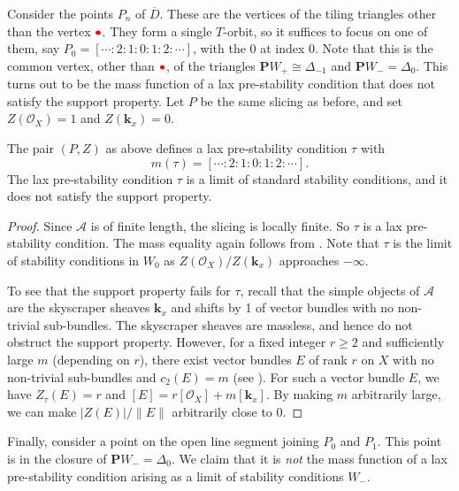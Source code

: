 \documentclass{amsart}
\begin{document}
Consider the points \(P_n\) of \(\overline D\).
These are the vertices of the tiling triangles other than the vertex \(\textcolor{red}{\bullet}\).
They form a single \(T\)-orbit, so it suffices to focus on one of them, say \(P_0 = [\cdots : 2:1:0:1:2: \cdots]\), with the \(0\) at index \(0\).
Note that this is the common vertex, other than \(\textcolor{red}{\bullet}\), of the triangles \(\mathbf{P}W_{+} \cong \Delta_{-1}\) and \(\mathbf{P}W_- = \Delta_0\).
This turns out to be the mass function of a lax pre-stability condition that does not satisfy the support property.
Let \(P\) be the same slicing as before, and set \(Z(\mathcal{O}_X) = 1\) and \(Z(\mathbf{k}_x) = 0\).
\begin{proposition}\label{prop:v0}
  The pair \((P,Z)\) as above defines a lax pre-stability condition \(\tau\) with
\[m(\tau) = [\cdots : 2: 1 : 0: 1 : 2: \cdots].\]
  The lax pre-stability condition \(\tau\) is a limit of standard stability conditions, and it does not satisfy the support property.
\end{proposition}
\begin{proof}
  Since \(\mathcal{A}\) is of finite length, the slicing is locally finite.
  So \(\tau\) is a lax pre-stability condition.
  The mass equality again follows from .
  Note that \(\tau\) is the limit of stability conditions in \(W_0\) as \(Z(\mathcal{O}_X)/Z(\mathbf{k}_x)\) approaches \(-\infty\).

  To see that the support property fails for \(\tau\), recall that the simple objects of \(\mathcal{A}\) are the skyscraper sheaves \(\mathbf{k}_x\) and shifts by 1 of vector bundles with no non-trivial sub-bundles.
  The skyscraper sheaves are massless, and hence do not obstruct the support property.
  However, for a fixed integer \(r \geq 2\) and sufficiently large \(m\) (depending on \(r\)), there exist vector bundles \(E\) of rank \(r\) on \(X\) with no non-trivial sub-bundles and \(c_2(E) = m\) (see \cite[Th\'eor\`eme~5.3]{ban.le-pot:87}).
  For such a vector bundle \(E\), we have \(Z_{\tau}(E) = r\) and \([E] = r [\mathcal{O}_X] + m [\mathbf{k}_x]\).
  By making \(m\) arbitrarily large, we can make \(|Z(E)|/\|E\|\) arbitrarily close to \(0\).
\end{proof}


Finally, consider a point on the open line segment joining \(P_{0}\) and \(P_{1}\).
This point is in the closure of \(\mathbf{P}W_- = \Delta_0\).
We claim that it is \emph{not} the mass function of a lax pre-stability condition arising as a limit of stability conditions \(W_-\).
\end{document}
